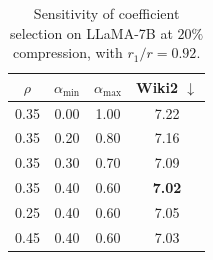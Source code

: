 \begin{table}[t]
\centering
\footnotesize
\renewcommand{\arraystretch}{1.1}
\setlength{\tabcolsep}{7pt}
\caption{Sensitivity of coefficient selection on LLaMA-7B at $20\%$ compression, with $r_1/r=0.92$.}
\label{tab:beta-sensitivity}
\begin{tabular}{cccc}
\toprule
$\rho$ & $\alpha_{\min}$ & $\alpha_{\max}$ & Wiki2 $\downarrow$ \\
\midrule
0.35 & 0.00 & 1.00 & 7.22 \\
0.35 & 0.20 & 0.80 & 7.16 \\
0.35 & 0.30 & 0.70 & 7.09 \\
0.35 & 0.40 & 0.60 & \textbf{7.02} \\
\midrule
0.25 & 0.40 & 0.60 & 7.05 \\
0.45 & 0.40 & 0.60 & 7.03 \\
\bottomrule
\end{tabular}
\end{table}
